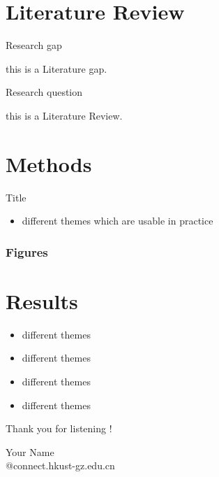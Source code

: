 \documentclass[serif, aspectratio=169]{beamer}
\begin{document}
\section{Literature Review}
\begin{frame}{Research gap}

   this is a Literature gap.

\end{frame}

\begin{frame}{Research question}

   this is a Literature Review.

\end{frame}

\section{Methods}
\begin{frame}{Title}
    \begin{itemize}
        \item different themes which are usable in practice
    \end{itemize}
\end{frame}

\begin{frame}
	\frametitle<presentation>{Figures}
	
\end{frame}


\section{Results}
\begin{frame}
    \begin{itemize}
        \item different themes
        \item different themes
        \item different themes
        \item different themes
    \end{itemize}
\end{frame}


\begin{frame}
\begin{center}
{ Thank you for listening !}
\vspace{1cm}

Your Name \\[1em]
@connect.hkust-gz.edu.cn 
\end{center}
\end{frame}
\end{document}
